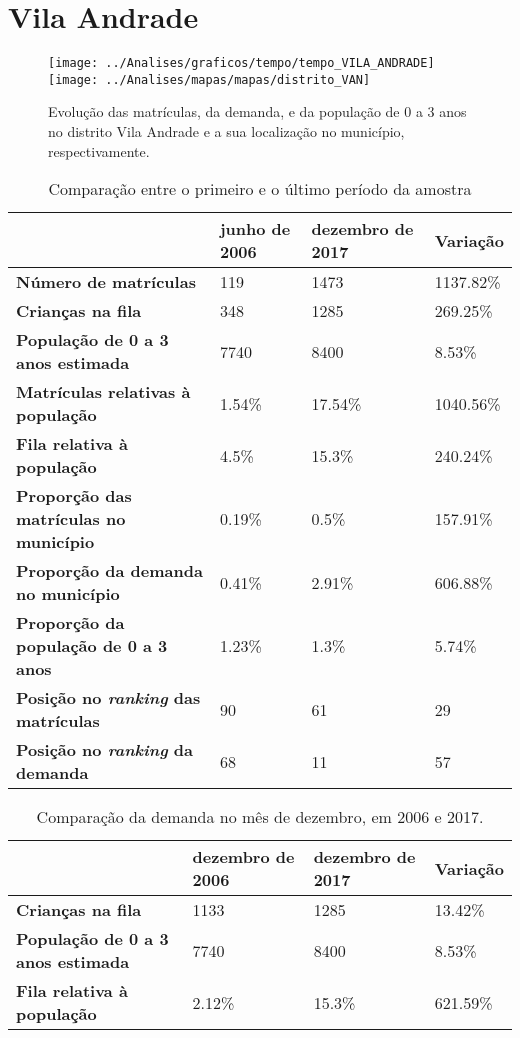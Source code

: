 \section{Vila Andrade}
\begin{figure}[H]
	\centering
	\texttt{[image: ../Analises/graficos/tempo/tempo\_VILA\_ANDRADE]}
	\texttt{[image: ../Analises/mapas/mapas/distrito\_VAN]}
	\caption{Evolução das matrículas, da demanda, e da população de 0 a 3 anos no distrito Vila Andrade e a sua localização no município, respectivamente.}
\end{figure}
\begin{table}[H]
	\begin{tabular}{|l|l|l|l|}
		\hline
		\textbf{}                                      & \textbf{junho de 2006}       & \textbf{dezembro de 2017}    & \textbf{Variação} \\ \hline
		\textbf{Número de matrículas}                  & 119 & 1473 & 1137.82\% \\ \hline
		\textbf{Crianças na fila}                      & 348 & 1285 & 269.25\% \\ \hline
		\textbf{População de 0 a 3 anos estimada}      & 7740 & 8400 & 8.53\% \\ \hline
		\textbf{Matrículas relativas à população}      & 1.54\% & 17.54\% & 1040.56\% \\ \hline
		\textbf{Fila relativa à população}             & 4.5\% & 15.3\% & 240.24\% \\ \hline
		\textbf{Proporção das matrículas no município} & 0.19\% & 0.5\% & 157.91\% \\ \hline
		\textbf{Proporção da demanda no município}     & 0.41\% & 2.91\% & 606.88\% \\ \hline
		\textbf{Proporção da população de 0 a 3 anos}  & 1.23\% & 1.3\% & 5.74\% \\ \hline
		\textbf{Posição no \textit{ranking} das matrículas}     & 90 & 61 & 29 \\ \hline
		\textbf{Posição no \textit{ranking} da demanda}         & 68 & 11 & 57 \\ \hline
	\end{tabular}
	\caption{Comparação entre o primeiro e o último período da amostra}
\end{table}
\begin{table}[H]
	\begin{tabular}{|l|l|l|l|}
		\hline
		\textbf{}                                 & \textbf{dezembro de 2006} & \textbf{dezembro de 2017} & \textbf{Variação} \\ \hline
		\textbf{Crianças na fila}                      & 1133 & 1285 & 13.42\% \\ \hline
		\textbf{População de 0 a 3 anos estimada}      & 7740 & 8400 & 8.53\% \\ \hline
		\textbf{Fila relativa à população}             & 2.12\% & 15.3\% & 621.59\% \\ \hline
	\end{tabular}
	\caption{Comparação da demanda no mês de dezembro, em 2006 e 2017.}
\end{table}
